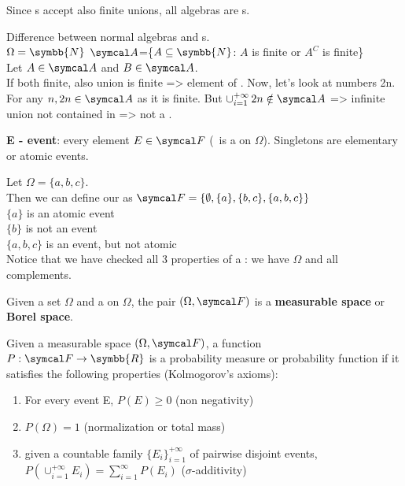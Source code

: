 Since \sigal s accept also finite unions, all algebras are \sigal s.
\begin{example}
Difference between normal algebras and \sigal s.\\$\Omega = \symbb{N}$ $\aii$=\{$A \subseteq \symbb{N}$: $A$ is finite or $A^C$ is finite\}\\Let $A \in \aii$ and $B \in \aii$.\\If both finite, also union is finite => element of \aii. Now, let's look at numbers 2n. For any $n, 2n \in \aii$ as it is finite. But $\cup^{+\infty}_{i=1}\,2n \notin \aii$ => infinite union not contained in \aii => not a \sigal.
\end{example}
\begin{definition}
    \textbf{E - event}: every element $E \in \eff$ (\eff\, is a \sigal on $\Omega$). Singletons are elementary or atomic events.
\end{definition}
\begin{example}
    Let $\Omega=\{a, b, c\}$.\\Then we can define our \sigal{} as $\eff =\{\emptyset, \{a\}, \{b, c\}, \{a, b, c\}\}$\\
    $\{a\}$ is an atomic event\\
    $\{b\}$ is not an event\\
    $\{a, b, c\}$ is an event, but not atomic\\
    Notice that we have checked all 3 properties of a \sigal: we have $\Omega$ and all complements.
\end{example}
\begin{definition}
    Given a set $\Omega$ and a \sigal{} \eff{}  on $\Omega$, the pair $(\Omega, \eff)$ is a \textbf{measurable space} or \textbf{Borel space}.
\end{definition}
\begin{definition}
    Given a measurable space $(\Omega, \eff)$, a function $P: \eff \to \symbb{R}$ is a probability measure or probability function if it satisfies the following properties (Kolmogorov's axioms):
    \begin{enumerate}
        \item For every event E, $P(E) \ge 0$ (non negativity)
        \item $P(\Omega) = 1$ (normalization or total mass)
        \item given a countable family $\{E_i\}^{+\infty}_{i=1}$ of pairwise disjoint events, $P(\cup^{+\infty}_{i=1}E_i) = \sum_{i=1}^{\infty} P(E_i)$ ($\sigma$-additivity)
    \end{enumerate}
\end{definition}
